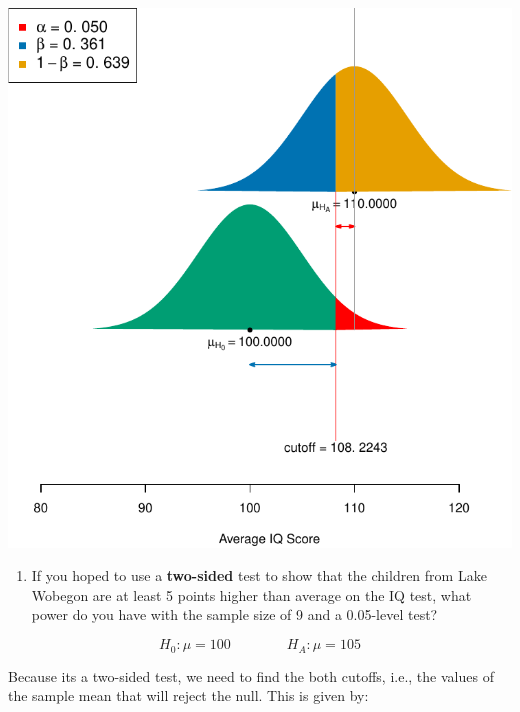 \documentclass[letterpaper,11pt,twoside,]{pinp}
\providecommand{\tightlist}{%
  \setlength{\itemsep}{0pt}\setlength{\parskip}{0pt}}
\begin{document}
\begin{center}\includegraphics{006-power-solutions_files/figure-latex/unnamed-chunk-4-1} \end{center}

\begin{enumerate}
\def\labelenumi{\alph{enumi})}
\setcounter{enumi}{2}
\tightlist
\item
  If you hoped to use a \textbf{two-sided} test to show that the
  children from Lake Wobegon are at least 5 points higher than average
  on the IQ test, what power do you have with the sample size of 9 and a
  0.05-level test?
\end{enumerate}

\[
H_0: \mu = 100 \qquad \qquad H_A: \mu = 105
\]

Because its a two-sided test, we need to find the both cutoffs, i.e.,
the values of the sample mean that will reject the null. This is given
by:

\begin{Shaded}
\begin{Highlighting}[]
\OtherTok{\textless{}{-}} \NormalTok{(}\NormalTok{(}\NormalTok{, }\NormalTok{), }\NormalTok{, } \SpecialCharTok{/} \NormalTok{(}\NormalTok{)))}
\end{Highlighting}
\end{Shaded}
\end{document}
